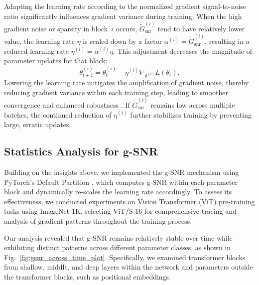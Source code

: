 Adapting the learning rate according to the normalized gradient signal-to-noise ratio significantly influences gradient variance during training. When the high gradient noise or sparsity in block~$i$ occurs, $\tilde{G}_{\text{snr}}^{(i)}$ tend to have relatively lower value, the learning rate $\eta$ is scaled down by a factor $\alpha^{(i)} = \tilde{G}_{\text{snr}}^{(i)}$, resulting in a reduced learning rate $\eta^{(i)} = \alpha^{(i)} \eta$. This adjustment decreases the magnitude of parameter updates for that block:
\[
\theta^{(i)}_{t+1} = \theta^{(i)}_t - \eta^{(i)} \nabla_{\theta^{(i)}} L(\theta_t).
\]
Lowering the learning rate mitigates the amplification of gradient noise, thereby reducing gradient variance within each training step, leading to smoother convergence and enhanced robustness \cite{liu2019variance}. If $\tilde{G}_{\text{snr}}^{(i)}$ remains low across multiple batches, the continued reduction of $\eta^{(i)}$ further stabilizes training by preventing large, erratic updates.

\subsection{Statistics Analysis for g-SNR}
Building on the insights above, we implemented the g-SNR mechanism using PyTorch's Default Partition \cite{zhang2024adamminiusefewerlearning}, which computes g-SNR within each parameter block and dynamically re-scales the learning rate accordingly. To assess its effectiveness, we conducted experiments on Vision Transformer (ViT) pre-training tasks using ImageNet-1K, selecting ViT/S-16 for comprehensive tracing and analysis of gradient patterns throughout the training process.

Our analysis revealed that g-SNR remains relatively stable over time while exhibiting distinct patterns across different parameter classes, as shown in Fig.~\ref{fig:gsnr_across_time_plot}. Specifically, we examined transformer blocks from shallow, middle, and deep layers within the network and parameters outside the transformer blocks, such as positional embeddings. 

